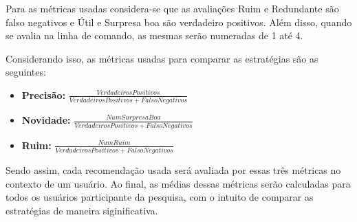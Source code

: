 Para as métricas usadas considera-se que as avaliações Ruim e Redundante são
falso negativos e Útil e Surpresa boa são verdadeiro positivos. Além disso,
quando se avalia na linha de comando, as mesmas serão numeradas de 1 até 4.

Considerando isso, as métricas usadas para comparar as estratégias são as
seguintes:

\begin{itemize}
    \item \textbf{Precisão: } $\frac{VerdadeirosPositivos}{VerdadeirosPositivos
        + FalsoNegativos}$
    \item \textbf{Novidade: } $\frac{NumSurpresaBoa}{VerdadeirosPositivos +
        FalsoNegativos}$
    \item \textbf{Ruim: } $\frac{NumRuim}{VerdadeirosPositivos +
        FalsoNegativos}$
\end{itemize}

Sendo assim, cada recomendação usada será avaliada por essas três métricas no
contexto de um usuário. Ao final, as médias dessas métricas serão calculadas para
todos os usuários participante da pesquisa, com o intuito de comparar as
estratégias de maneira siginificativa.

